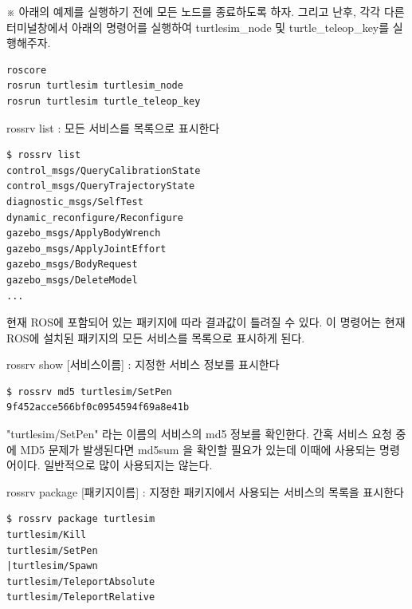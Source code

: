 \vspace{\baselineskip}
\noindent
※ 아래의 예제를 실행하기 전에 모든 노드를 종료하도록 하자. 그리고 난후, 각각 다른 터미널창에서 아래의 명령어를 실행하여 turtlesim\_node 및 turtle\_teleop\_key를 실행해주자.

\begin{lstlisting}[language=ROS]
roscore
rosrun turtlesim turtlesim_node 
rosrun turtlesim turtle_teleop_key
\end{lstlisting}

\setcounter{num}{0}

\vspace{\baselineskip}
\noindent
{}\circled{\thenum} rossrv list : 모든 서비스를 목록으로 표시한다

\begin{lstlisting}[language=ROS]
$ rossrv list
control_msgs/QueryCalibrationState
control_msgs/QueryTrajectoryState
diagnostic_msgs/SelfTest
dynamic_reconfigure/Reconfigure
gazebo_msgs/ApplyBodyWrench
gazebo_msgs/ApplyJointEffort
gazebo_msgs/BodyRequest
gazebo_msgs/DeleteModel
...
\end{lstlisting}

\noindent
현재 ROS에 포함되어 있는 패키지에 따라 결과값이 틀려질 수 있다. 이 명령어는 현재 ROS에 설치된 패키지의 모든 서비스를 목록으로 표시하게 된다.

\vspace{\baselineskip}
\noindent
{}\circled{\thenum} rossrv show [서비스이름] : 지정한 서비스 정보를 표시한다

\begin{lstlisting}[language=ROS]
$ rossrv md5 turtlesim/SetPen 
9f452acce566bf0c0954594f69a8e41b
\end{lstlisting}

\noindent
"turtlesim/SetPen" 라는 이름의 서비스의 md5 정보를 확인한다. 간혹 서비스 요청 중에 MD5 문제가 발생된다면 md5sum 을 확인할 필요가 있는데 이때에 사용되는 명령어이다. 일반적으로 많이 사용되지는 않는다.

\vspace{\baselineskip}
\noindent
{}\circled{\thenum} rossrv package [패키지이름] : 지정한 패키지에서 사용되는 서비스의 목록을 표시한다

\begin{lstlisting}[language=ROS]
$ rossrv package turtlesim 
turtlesim/Kill
turtlesim/SetPen
|turtlesim/Spawn
turtlesim/TeleportAbsolute
turtlesim/TeleportRelative
\end{lstlisting}

